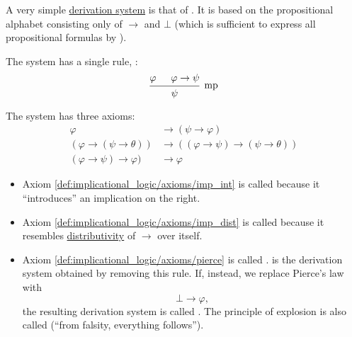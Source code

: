 \begin{definition}\label{def:propositional_implicational_logic}
  A very simple \hyperref[def:first_order_derivation_system]{derivation system} is that of . It is based on the propositional alphabet consisting only of \( \to \) and \( \bot \) (which is sufficient to express all propositional formulas by ).

  \begin{refenum}
     The system has a single rule, :
    \begin{equation}\label{eq:def:implicational_logic/rules/modus_ponens}
      \begin{prooftree}
        \hypo{\varphi}
        \hypo{\varphi \to \psi}
        \infer2[mp]{\psi}
      \end{prooftree}
    \end{equation}

     The system has three axioms:
    \begin{align}
      \varphi                         &\to (\psi \to \varphi)                         \label{def:implicational_logic/axioms/imp_int} \\
      (\varphi \to (\psi \to \theta)) &\to ((\varphi \to \psi) \to (\psi \to \theta)) \label{def:implicational_logic/axioms/imp_dist} \\
      (\varphi \to \psi) \to \varphi) &\to \varphi                                    \label{def:implicational_logic/axioms/pierce}
    \end{align}

    \begin{itemize}
      \item Axiom \eqref{def:implicational_logic/axioms/imp_int} is called  because it \enquote{introduces} an implication on the right.
      \item Axiom \eqref{def:implicational_logic/axioms/imp_dist} is called  because it resembles \hyperref[def:distributive_lattice]{distributivity} of \( \to \) over itself.
      \item Axiom \eqref{def:implicational_logic/axioms/pierce} is called .  is the derivation system obtained by removing this rule. If, instead, we replace Pierce's law with 
      \begin{equation}\label{def:implicational_logic/axioms/explosion}
        \bot \to \varphi,
      \end{equation}
      the resulting derivation system is called . The principle of explosion is also called  (\enquote{from falsity, everything follows}).


\end{itemize}
\end{refenum}
\end{definition}

